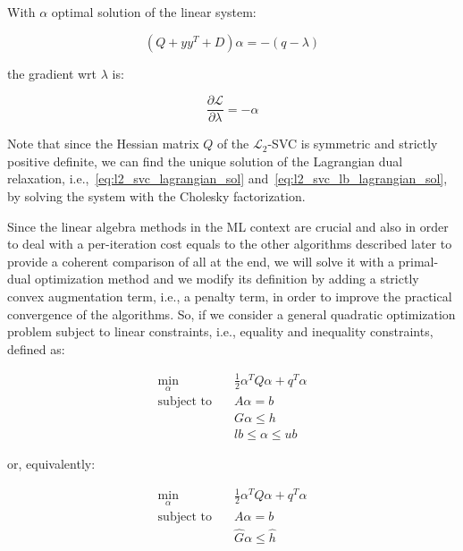 With $\alpha$ optimal solution of the linear system:

\begin{equation} \label{eq:l2_svc_lb_lagrangian_sol}
    (Q + yy^T + D) \alpha = - (q - \lambda)
\end{equation}

the gradient wrt $\lambda$ is:

\begin{equation} \label{eq:l2_svc_lb_lagrangian_der_l}
    \frac{\partial \mathcal{L}}{\partial \lambda}=-\alpha
\end{equation}

\bigskip

Note that since the Hessian matrix $Q$ of the $\mathcal{L}_2$-SVC is symmetric and strictly positive definite, we can find the unique solution of the Lagrangian dual relaxation, i.e.,~\ref{eq:l2_svc_lagrangian_sol} and~\ref{eq:l2_svc_lb_lagrangian_sol}, by solving the system with the Cholesky factorization.

\bigskip

Since the linear algebra methods in the ML context are crucial and also in order to deal with a per-iteration cost equals to the other algorithms described later to provide a coherent comparison of all at the end, we will solve it with a primal-dual optimization method and we modify its definition by adding a strictly convex augmentation term, i.e., a penalty term, in order to improve the practical convergence of the algorithms. So, if we consider a general quadratic optimization problem subject to linear constraints, i.e., equality and inequality constraints, defined as:

\begin{equation}
    \begin{aligned} 
        \min_{\alpha} \quad & \frac{1}{2} \alpha^T Q \alpha + q^T \alpha \\
            \textrm{subject to} \quad & A \alpha = b \\ & G \alpha \leq h \\ & lb \leq \alpha \leq ub
    \end{aligned}
\end{equation}

or, equivalently:

\begin{equation}
    \begin{aligned}
        \min_{\alpha} \quad & \frac{1}{2} \alpha^T Q \alpha + q^T \alpha \\
            \textrm{subject to} \quad & A \alpha = b \\ & \hat{G} \alpha \leq \hat{h}
    \end{aligned}
\end{equation}

